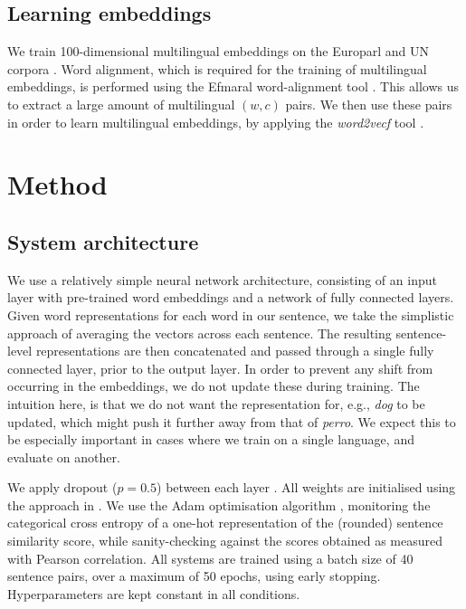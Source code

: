 \documentclass[11pt,a4paper]{article}
\begin{document}
\subsection{Learning embeddings}
We train 100-dimensional multilingual embeddings on the Europarl \cite{europarl} and UN corpora \cite{uncorp}.
Word alignment, which is required for the training of multilingual embeddings, is performed using the Efmaral word-alignment tool \cite{efmaral}.
This allows us to extract a large amount of multilingual $(w,c)$ pairs.
We then use these pairs in order to learn multilingual embeddings, by applying the \textit{word2vecf} tool \cite{word2vecf}.

\section{Method}

\subsection{System architecture}

We use a relatively simple neural network architecture, consisting of an input layer with pre-trained word embeddings and a network of fully connected layers.
Given word representations for each word in our sentence, we take the simplistic approach of averaging the vectors across each sentence.
The resulting sentence-level representations are then concatenated and passed through a single fully connected layer, prior to the output layer.
In order to prevent any shift from occurring in the embeddings, we do not update these during training.
The intuition here, is that we do not want the representation for, e.g., \textit{dog} to be updated, which might push it further away from that of \textit{perro}.
We expect this to be especially important in cases where we train on a single language, and evaluate on another.

We apply dropout ($p=0.5$) between each layer \cite{dropout}.
All weights are initialised using the approach in .
We use the Adam optimisation algorithm \cite{adam}, monitoring the categorical cross entropy of a one-hot representation of the (rounded) sentence similarity score, while sanity-checking against the scores obtained as measured with Pearson correlation.
All systems are trained using a batch size of 40 sentence pairs, over a maximum of 50 epochs, using early stopping.
Hyperparameters are kept constant in all conditions.
\end{document}
